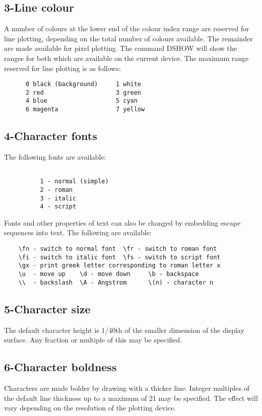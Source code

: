 \documentclass{book}
\renewcommand{\_}{{\tt\char'137}}     %
\begin{document}
\subsection{3-Line colour}
A number of colours at the lower end of the colour index range
are reserved for line plotting, depending on the total number
of colours available. The remainder are made available for
pixel plotting. The command DSHOW will show the ranges for
both which are available on the current device. The maximum
range reserved for line plotting is as follows:
\begin{verbatim}
      0 black (background)     1 white
      2 red                    3 green
      4 blue                   5 cyan
      6 magenta                7 yellow
\end{verbatim}
\subsection{4-Character fonts}
The following fonts are available:
\begin{verbatim}

          1 - normal (simple)
          2 - roman
          3 - italic
          4 - script
\end{verbatim}
Fonts and other properties of text can also be changed by
embedding escape sequences into text. The following are
available:
\begin{verbatim}
    \fn - switch to normal font  \fr - switch to roman font
    \fi - switch to italic font  \fs - switch to script font
    \gx - print greek letter corresponding to roman letter x
    \u  - move up    \d - move down     \b - backspace
    \\  - backslash  \A - Angstrom      \(n) - character n
\end{verbatim}
\subsection{5-Character size}
The default character height is 1/40th of the smaller dimension
of the display surface. Any fraction or multiple of this may be
specified.

\subsection{6-Character boldness}
Characters are made bolder by drawing with a thicker line.
Integer multiples of the default line thickness up to a
maximum of 21 may be specified. The effect will vary
depending on the resolution of the plotting device.
\end{document}
